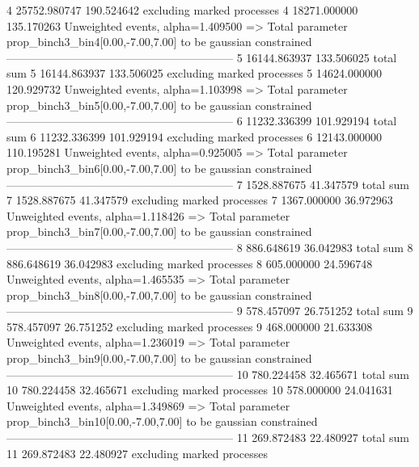 4          25752.980747    190.524642      excluding marked processes    
4          18271.000000    135.170263      Unweighted events, alpha=1.409500
  => Total parameter prop_binch3_bin4[0.00,-7.00,7.00] to be gaussian constrained
------------------------------------------------------------
5          16144.863937    133.506025      total sum                     
5          16144.863937    133.506025      excluding marked processes    
5          14624.000000    120.929732      Unweighted events, alpha=1.103998
  => Total parameter prop_binch3_bin5[0.00,-7.00,7.00] to be gaussian constrained
------------------------------------------------------------
6          11232.336399    101.929194      total sum                     
6          11232.336399    101.929194      excluding marked processes    
6          12143.000000    110.195281      Unweighted events, alpha=0.925005
  => Total parameter prop_binch3_bin6[0.00,-7.00,7.00] to be gaussian constrained
------------------------------------------------------------
7          1528.887675     41.347579       total sum                     
7          1528.887675     41.347579       excluding marked processes    
7          1367.000000     36.972963       Unweighted events, alpha=1.118426
  => Total parameter prop_binch3_bin7[0.00,-7.00,7.00] to be gaussian constrained
------------------------------------------------------------
8          886.648619      36.042983       total sum                     
8          886.648619      36.042983       excluding marked processes    
8          605.000000      24.596748       Unweighted events, alpha=1.465535
  => Total parameter prop_binch3_bin8[0.00,-7.00,7.00] to be gaussian constrained
------------------------------------------------------------
9          578.457097      26.751252       total sum                     
9          578.457097      26.751252       excluding marked processes    
9          468.000000      21.633308       Unweighted events, alpha=1.236019
  => Total parameter prop_binch3_bin9[0.00,-7.00,7.00] to be gaussian constrained
------------------------------------------------------------
10         780.224458      32.465671       total sum                     
10         780.224458      32.465671       excluding marked processes    
10         578.000000      24.041631       Unweighted events, alpha=1.349869
  => Total parameter prop_binch3_bin10[0.00,-7.00,7.00] to be gaussian constrained
------------------------------------------------------------
11         269.872483      22.480927       total sum                     
11         269.872483      22.480927       excluding marked processes    
